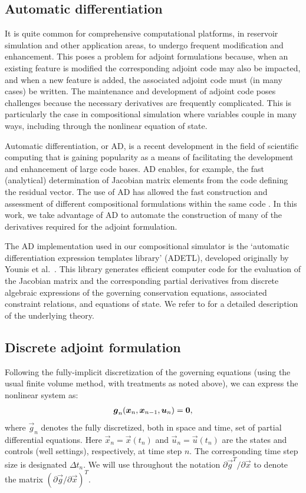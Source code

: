 \documentclass[twocolumn,numbook]{svjour3}          %
\def\u{{\vec u}}
\def\x{{\vec x}}
\def\p{{\vec{g}}}
\def\0{{\vec 0}}
\begin{document}
\subsection{Automatic differentiation} \label{sec:autodiff}


It is quite common for comprehensive computational platforms, in reservoir
simulation and other application areas, to undergo frequent modification and enhancement. This poses a problem for adjoint formulations
because, when an existing feature is modified the corresponding adjoint code may
also be impacted, and when a new feature is added, the associated adjoint code
must (in many cases) be written. The maintenance and development of adjoint code
poses challenges because the necessary derivatives are frequently complicated.
This is particularly the case in compositional simulation where variables couple
in many ways, including through the nonlinear equation of state.


Automatic differentiation, or AD, is a recent development in the field of
scientific computing that is gaining popularity as a means of facilitating the
development and enhancement of large code bases. AD enables, for example, the
fast (analytical) determination of Jacobian matrix elements from the code
defining the residual vector. The use of AD has allowed the fast construction
and assessment of different compositional formulations within the same code
\cite{Voskov_nonlinear:2009}. In this work, we take advantage of AD to automate
the construction of many of the derivatives required for the adjoint
formulation.


The AD implementation used in our compositional simulator is the `automatic
differentiation expression templates library' (ADETL), developed originally by
Younis et al.~\cite{Younis:2007}.  This library generates efficient computer
code for the evaluation of the Jacobian matrix and the corresponding partial
derivatives from discrete algebraic expressions of the governing conservation
equations, associated constraint relations, and equations of state. We refer to
\cite{Younis:2007} for a detailed description of the underlying theory.


\subsection{Discrete adjoint formulation} \label{section:discreteAdjoint}

Following the fully-implicit discretization of the governing equations (using the usual finite volume method, with treatments as noted above), we can express the nonlinear system as:
%
\begin{align}
\label{eq:DiscretizedEquations}
\p_n(\x_n, \x_{n-1}, \u_n) =  \0 \rm,
\end{align}
%
where $\p_n$ denotes the fully discretized, both in space and time,
set of partial differential equations. Here $\x_n = \x(t_n)$ and $\u_n =
\u(t_n)$ are the states and controls (well settings), respectively, at time step $n$. The corresponding time step size
is designated $\Delta t_n$. We will use throughout the notation $\partial \p^T / \partial \x$ to denote the matrix $(\partial \p / \partial \x)^T$.
\end{document}
